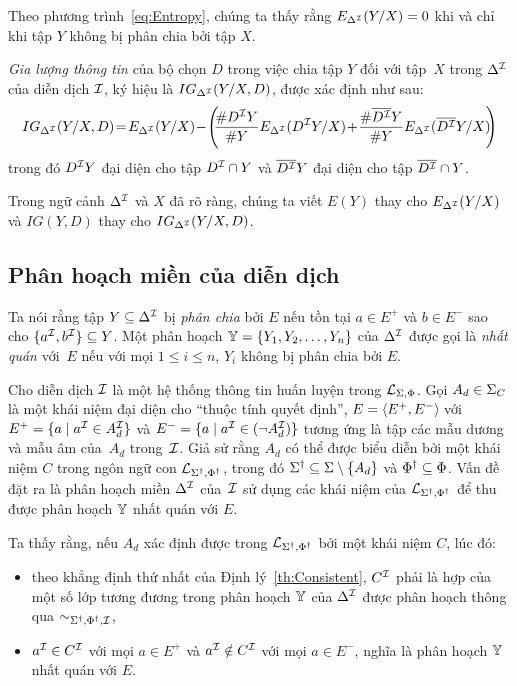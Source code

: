\begin{Remark}
	Theo phương trình~\eqref{eq:Entropy}, chúng ta thấy rằng $E_{\Delta^{\mathcal{I}}}(Y/X) = 0$ khi và chỉ khi tập $Y$ không bị phân chia bởi tập $X$.\myend
\end{Remark}

\begin{Definition}
	{\em Gia lượng thông tin} của bộ chọn $D$ trong việc chia tập $Y$ đối với tập~$X$ trong $\Delta^{\mathcal{I}}$ của diễn dịch $\mathcal{I}$, ký hiệu là $IG_{\Delta^{\mathcal{I}}}(Y/X, D)$, được xác định như sau:
	\begin{equation}
		\!\!IG_{\Delta^\mI}(Y/X, D)\!=\!E_{\Delta^\mI}(Y/X)\!-\!
		\left(\!\!\frac{\sharp D^\mI Y}{\sharp Y}E_{\Delta^\mI}(D^\mI Y/X)\!+\!\frac{\sharp \overline{D^\mI}Y}{\sharp Y}E_{\Delta^\mI}(\overline{D^\mI}Y/X)\!\!\right)\!\! \label{eq:InfoGain}
	\end{equation}
	trong đó $D^{\mathcal{I}} Y$ đại diện cho tập $D^{\mathcal{I}} \cap Y$ và $\overline{D^{\mathcal{I}}}Y$ đại diện cho tập $\overline{D^{\mathcal{I}}} \cap Y$.\myend
\end{Definition}

Trong ngữ cảnh $\Delta^{\mathcal{I}}$ và $X$ đã rõ ràng, chúng ta viết $E(Y)$ thay cho $E_{\Delta^{\mathcal{I}}}(Y/X)$ và $IG(Y, D)$ thay cho $IG_{\Delta^{\mathcal{I}}}(Y/X, D)$.

\subsection{Phân hoạch miền của diễn dịch}

Ta nói rằng tập $Y \subseteq \Delta^{\mathcal{I}}$ bị {\em phân chia} bởi $E$ nếu tồn tại $a \in E^+$ và $b \in E^-$ sao cho $\{a^{\mathcal{I}}, b^{\mathcal{I}}\} \subseteq Y$. Một phân hoạch $\mathbb{Y} = \{Y_1, Y_2, \ldots, Y_n\}$ của $\Delta^{\mathcal{I}}$ được gọi là {\em nhất quán} với~$E$ nếu với mọi $1 \leq i \leq n$, $Y_i$ không bị phân chia bởi $E$.

Cho diễn dịch $\mathcal{I}$ là một hệ thống thông tin huấn luyện trong $\mathcal{L}_{\Sigma,\Phi}$. Gọi $A_d \in \Sigma_C$ là một khái niệm đại diện cho ``thuộc tính quyết định'', $E = \left\langle E^+, E^-\right\rangle\!$ với $E^+ = \{a \mid a^{\mathcal{I}} \in A_d^{\mathcal{I}}\}$ và $E^- = \{a \mid a^{\mathcal{I}} \in (\neg A_d^{\mathcal{I}})\}$ tương ứng là tập các mẫu dương và mẫu âm của~$A_d$ trong~$\mathcal{I}$. Giả sử rằng $A_d$ có thể được biểu diễn bởi một khái niệm $C$ trong ngôn ngữ con $\mathcal{L}_{\Sigma^\dag,\Phi^\dag}$, trong đó $\Sigma^\dag \subseteq \Sigma \setminus \{A_d\}$ và $\Phi^\dag \subseteq \Phi$. Vấn đề đặt ra là phân hoạch miền $\Delta^{\mathcal{I}}$ của~$\mathcal{I}$ sử dụng các khái niệm của $\mathcal{L}_{\Sigma^\dag,\Phi^\dag}$ để thu được phân hoạch $\mathbb{Y}$ nhất quán với $E$.

Ta thấy rằng, nếu $A_d$ xác định được trong $\mathcal{L}_{\Sigma^\dag,\Phi^\dag}$ bởi một khái niệm $C$, lúc đó:
\begin{itemize}
	\item theo khẳng định thứ nhất của Định lý~\ref{th:Consistent}, $C^{\mathcal{I}}$ phải là hợp của một số lớp tương đương trong phân hoạch $\mathbb{Y}$ của $\Delta^{\mathcal{I}}$ được phân hoạch thông qua $\sim_{\Sigma^\dag,\Phi^\dag,\mathcal{I}}$,
	
	\item $a^{\mathcal{I}} \in C^{\mathcal{I}}$ với mọi $a \in E^+$ và $a^{\mathcal{I}} \notin C^{\mathcal{I}}$ với mọi $a \in E^-$, nghĩa là phân hoạch $\mathbb{Y}$ nhất quán với $E$.
\end{itemize}

